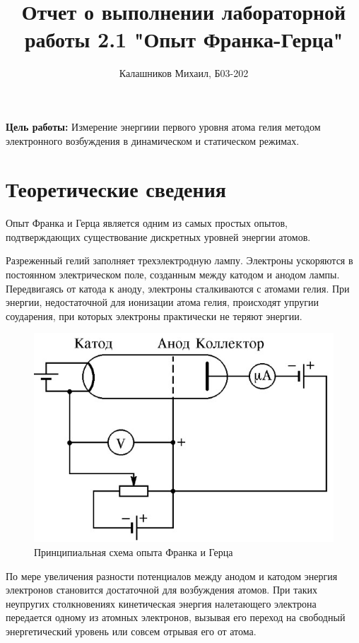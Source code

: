 \documentclass[14pt, a4paper]{report}
\title{\textbf{Отчет о выполнении лабораторной работы 2.1 "Опыт Франка-Герца"}}
\author{Калашников Михаил, Б03-202}
\date{}
\begin{document}
\maketitle

\textbf{Цель работы:}
Измерение энергиии первого уровня атома гелия методом электронного возбуждения в динамическом и статическом режимах.
\newline

\section{Теоретические сведения}

Опыт Франка и Герца является одним из самых простых опытов, подтверждающих существование дискретных уровней энергии атомов.

Разреженный гелий заполняет трехэлектродную лампу. Электроны ускоряются в постоянном электрическом поле, созданным между катодом и анодом лампы. Передвигаясь от катода к аноду, электроны сталкиваются с атомами гелия. При энергии, недостаточной для ионизации атома гелия, происходят упругии соударения, при которых электроны практически не теряют энергии.

\begin{figure}[H]
\centering
\includegraphics[scale=0.6]{../images/521-1}
\caption{Принципиальная схема опыта Франка и Герца}
\end{figure}

По мере увеличения разности потенциалов между анодом и катодом энергия электронов становится достаточной для возбуждения атомов. При таких неупругих столкновениях кинетическая энергия налетающего электрона передается одному из атомных электронов, вызывая его переход на свободный энергетический уровень или совсем отрывая его от атома.
\end{document}
